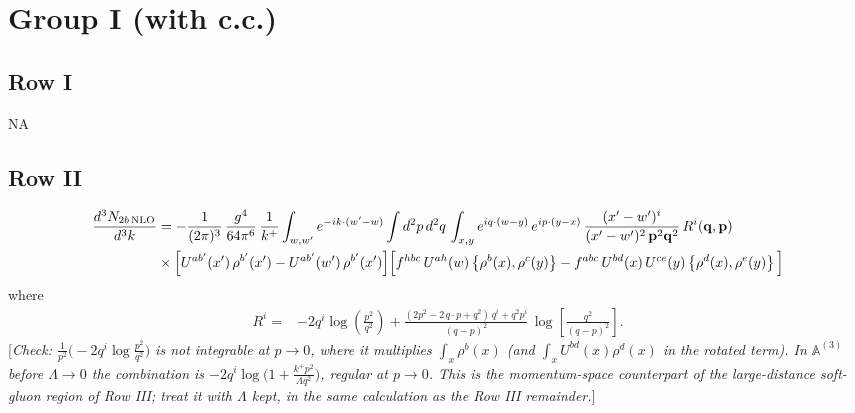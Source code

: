 \documentclass[9pt]{article}
\def\mf#1{\mathbb{#1}}
\newcommand{\rnote}[1]{{\color{teal}[\textit{#1}]}}
\numberwithin{equation}{section}
\begin{document}
\section{Group I (with c.c.)}
\subsection{Row I}
\textsc{NA}
\subsection{Row II}
\begin{align}
\frac{d^{3}N_{2b\,\rm NLO}}{d^{3}k} & = -\frac{1}{(2\pi)^{3}}\,\frac{g^{4}}{64\pi^{6}}\,\frac{1}{k^{+}}\int_{w,w'} e^{-ik\cdot(w'-w)}
\int d^{2}p\,d^{2}q\,\int_{x,y} e^{iq\cdot(w-y)}\,e^{ip\cdot(y-x)}\,\frac{(x'-w')^{i}}{(x'-w')^{2}\,\mathbf{p}^{2}\mathbf{q}^{2}}\,R^{i}(\mathbf{q},\mathbf{p})\notag\\ &\times\Big[U^{ab'}(x')\,\rho^{b'}(x')-U^{ab'}(w')\,\rho^{b'}(x')\Big]
\Big[f^{hbc}\,U^{ah}(w)\left\{\rho^{b}(x),\rho^{c}(y)\right\}-f^{abc}\,U^{bd}(x)\,U^{ce}(y)\left\{\rho^{d}(x),\rho^{e}(y)\right\}\Big]
\end{align}
where
\begin{align}
R^{i} =& -2q^{i}\log\left(\frac{p^{2}}{q^{2}}\right)
+\frac{(2p^{2}-2\,q\cdot p+q^{2})\,q^{i}+q^{2}p^{i}}{(q-p)^{2}}\,
\log\left[\frac{q^{2}}{(q-p)^{2}}\right].
\end{align}
\rnote{Check: $\frac{1}{p^{2}}\big(-2q^{i}\log\frac{p^{2}}{q^{2}}\big)$ is not integrable at $p\to0$, where it multiplies $\int_{x}\rho^{b}(x)$ (and $\int_{x}U^{bd}(x)\rho^{d}(x)$ in the rotated term). In $\mf{A}^{(3)}$ before $\Lambda\to0$ the combination is $-2q^{i}\log\big(1+\frac{k^{+}p^{2}}{\Lambda q^{2}}\big)$, regular at $p\to0$. This is the momentum-space counterpart of the large-distance soft-gluon region of Row III; treat it with $\Lambda$ kept, in the same calculation as the Row III remainder.}
\end{document}
